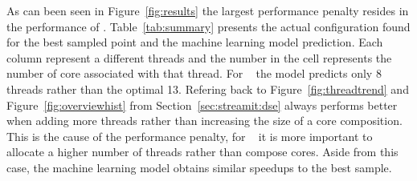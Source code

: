 As can been seen in Figure~\ref{fig:results} the largest performance penalty resides in the performance of .
Table~\ref{tab:summary} presents the actual configuration found for the best sampled point and the machine learning model prediction.
Each column represent a different threads and the number in the cell represents the number of core associated with that thread.
For ~ the model predicts only 8 threads rather than the optimal 13.
Refering back to Figure~\ref{fig:threadtrend} and Figure~\ref{fig:overviewhist} from Section~\ref{sec:streamit:dse}  always performs better when adding more threads rather than increasing the size of a core composition.
This is the cause of the performance penalty, for ~ it is more important to allocate a higher number of threads rather than compose cores.
Aside from this case, the machine learning model obtains similar speedups to the best sample.
\twocolumn
